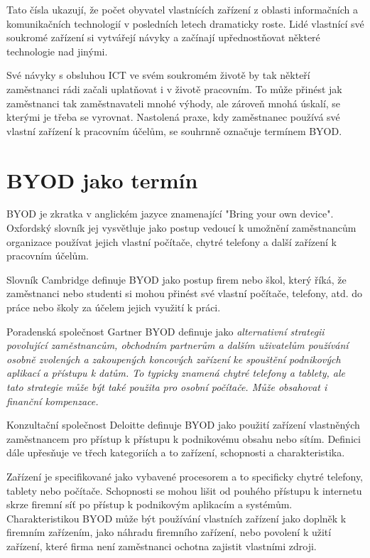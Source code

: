 Tato čísla ukazují, že počet obyvatel vlastnících zařízení z oblasti informačních a komunikačních technologií v posledních letech dramaticky roste. Lidé vlastnící své soukromé zařízení si vytvářejí návyky a začínají upřednostňovat některé technologie nad jinými.

Své návyky s obsluhou ICT ve svém soukromém životě by tak někteří zaměstnanci rádi začali uplatňovat i v životě pracovním. To může přinést jak zaměstnanci tak zaměstnavateli mnohé výhody, ale zároveň mnohá úskalí, se kterými je třeba se vyrovnat. Nastolená praxe, kdy zaměstnanec používá své vlastní zařízení k pracovním účelům, se souhrnně označuje termínem BYOD.



\section{BYOD jako termín}

BYOD je zkratka v anglickém jazyce znamenající "Bring your own device". Oxfordský slovník \cite{oxford} jej vysvětluje jako postup vedoucí k umožnění zaměstnancům organizace používat jejich vlastní počítače, chytré telefony a další zařízení k pracovním účelům. 

Slovník Cambridge \cite{cambridge} definuje BYOD jako postup firem nebo škol, který říká, že zaměstnanci nebo studenti si mohou přinést své vlastní počítače, telefony, atd.  do práce nebo školy za účelem jejich využití k práci. 

Poradenská společnost Gartner \cite{GartnerBYOD} BYOD definuje jako \textit{alternativní strategii povolující zaměstnancům, obchodním partnerům a dalším uživatelům používání osobně zvolených a zakoupených koncových zařízení ke spouštění podnikových aplikací a přístupu k datům. To typicky znamená chytré telefony a tablety, ale tato strategie může být také použita pro osobní počítače. Může obsahovat i finanční kompenzace.}

Konzultační společnost Deloitte \cite{DeloitteBYOD} definuje BYOD jako použití zařízení vlastněných zaměstnancem pro přístup k přístupu k podnikovému obsahu nebo sítím. Definici dále upřesňuje ve třech kategoriích a to zařízení, schopnosti a charakteristika. 

Zařízení je specifikované jako vybavené procesorem a to specificky chytré telefony, tablety nebo počítače. Schopnosti se mohou lišit od pouhého přístupu k internetu skrze firemní síť po přístup k podnikovým aplikacím a systémům. Charakteristikou BYOD může být používání vlastních zařízení jako doplněk k firemním zařízením, jako náhradu firemního zařízení, nebo povolení k užití zařízení, které firma není zaměstnanci ochotna zajistit vlastními zdroji. 

